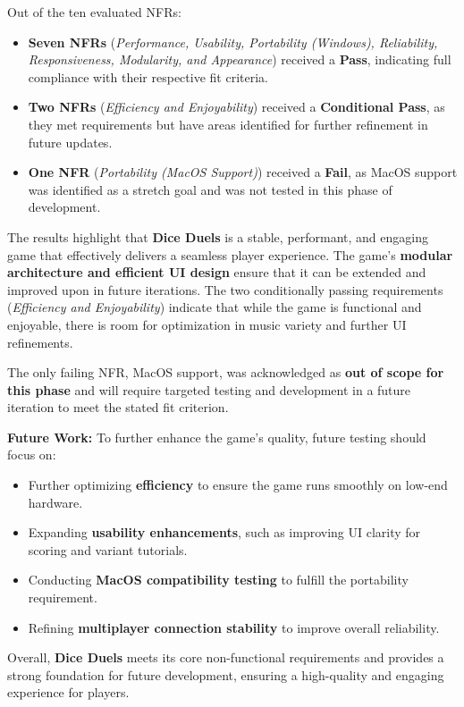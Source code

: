 \documentclass[12pt, titlepage]{article}
\begin{document}
Out of the ten evaluated NFRs:
\begin{itemize}
    \item \textbf{Seven NFRs} (\textit{Performance, Usability, Portability (Windows), Reliability, Responsiveness, Modularity, and Appearance}) received a \textbf{Pass}, indicating full compliance with their respective fit criteria.
    \item \textbf{Two NFRs} (\textit{Efficiency and Enjoyability}) received a \textbf{Conditional Pass}, as they met requirements but have areas identified for further refinement in future updates.
    \item \textbf{One NFR} (\textit{Portability (MacOS Support)}) received a \textbf{Fail}, as MacOS support was identified as a stretch goal and was not tested in this phase of development.
\end{itemize}

The results highlight that \textbf{Dice Duels} is a stable, performant, and engaging game that effectively delivers a seamless player experience. The game's \textbf{modular architecture and efficient UI design} ensure that it can be extended and improved upon in future iterations. The two conditionally passing requirements (\textit{Efficiency and Enjoyability}) indicate that while the game is functional and enjoyable, there is room for optimization in music variety and further UI refinements.

The only failing NFR, MacOS support, was acknowledged as \textbf{out of scope for this phase} and will require targeted testing and development in a future iteration to meet the stated fit criterion.

\textbf{Future Work:}  
To further enhance the game’s quality, future testing should focus on:
\begin{itemize}
    \item Further optimizing \textbf{efficiency} to ensure the game runs smoothly on low-end hardware.
    \item Expanding \textbf{usability enhancements}, such as improving UI clarity for scoring and variant tutorials.
    \item Conducting \textbf{MacOS compatibility testing} to fulfill the portability requirement.
    \item Refining \textbf{multiplayer connection stability} to improve overall reliability.
\end{itemize}

Overall, \textbf{Dice Duels} meets its core non-functional requirements and provides a strong foundation for future development, ensuring a high-quality and engaging experience for players.
\end{document}
